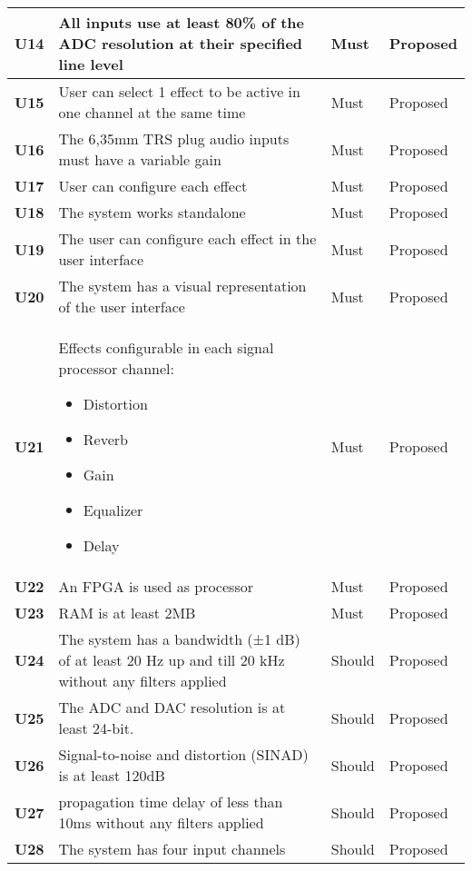 \begin{longtable}{|l|p{10cm}|l|l|}
	\textbf{U14}&All inputs use at least 80\% of the ADC resolution at their specified line level						& Must   & Proposed\\ \hline
	\textbf{U15}&User can select 1 effect to be active in one channel at the same time								& Must   & Proposed\\ \hline
	\textbf{U16}&The 6,35mm TRS plug audio inputs must have a variable gain										& Must   & Proposed\\ \hline
	\textbf{U17}&User can configure each effect														& Must   & Proposed\\ \hline
	\textbf{U18}&The system works standalone															& Must   & Proposed\\ \hline
	\textbf{U19}&The user can configure each effect in the user interface										& Must   & Proposed\\ \hline
	\textbf{U20}&The system has a visual representation of the user interface									& Must   & Proposed\\ \hline
	\textbf{U21}&Effects configurable in each signal processor channel: \newline
	\begin{itemize}
		\setlength\itemsep{-0.4em}
		\item Distortion
		\item Reverb
		\item Gain
		\item Equalizer
		\item Delay
	\end{itemize}																			& Must   & Proposed\\ \hline
	\textbf{U22} &An FPGA is used as processor														& Must   & Proposed\\ \hline
	\textbf{U23} &RAM is at least 2MB																& Must   & Proposed\\ \hline
	\textbf{U24} &The system has a bandwidth (±1 dB) of at least 20 Hz up and till 20 kHz without any filters applied 		& Should & Proposed\\ \hline
	\textbf{U25} &The ADC and DAC resolution is at least 24-bit.											& Should & Proposed\\ \hline
	\textbf{U26} &Signal-to-noise and distortion (SINAD) is at least 120dB 										& Should & Proposed\\ \hline
	\textbf{U27} &propagation time delay of less than 10ms without any filters applied 								& Should & Proposed\\ \hline
	\textbf{U28} &The system has four input channels 													& Should & Proposed\\ \hline

\end{longtable}
